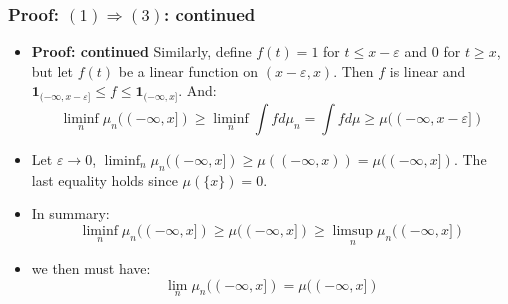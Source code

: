 \documentclass[handout]{beamer}
\newcommand{\BI}{\mathbf{1}}
\begin{document}
\frame
{
  \frametitle{Proof: $(1) \Rightarrow (3)$: continued} 

   \begin{itemize}

                     \item<1-> \textbf{Proof: continued} Similarly, define $f(t)=1$ for $t\leq x-\varepsilon$ and $0$ for $t\geq x$, but let $f(t)$ be a linear function on $(x-\varepsilon, x)$. Then $f$ is linear and $\BI_{(-\infty, x-\varepsilon]} \leq f \leq \BI_{(-\infty, x]}$. And:
                     $$\liminf_n \mu_n((-\infty, x]) \geq \liminf_n \int f d\mu_n=\int f d\mu \geq \mu((-\infty, x-\varepsilon])$$
                     
              \item<2->[-]     Let $\varepsilon\rightarrow 0$, $\liminf_n \mu_n((-\infty, x]) \geq \mu((-\infty, x) )=\mu((-\infty, x])$. The last equality holds since $\mu(\{x\})=0$. 
              
              \item<3->[-]  In summary:  $$\liminf_n \mu_n((-\infty, x]) \geq \mu((-\infty, x]) \geq \limsup_n \mu_n((-\infty, x])$$
               
               \item<4->[-] we then must have:  $$\lim_n \mu_n((-\infty, x]) =\mu((-\infty, x]) $$                    
                                               \end{itemize}
}
\end{document}
